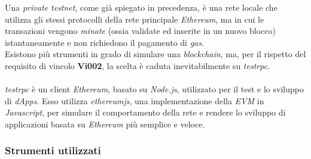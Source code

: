 \documentclass[11pt]{thesistemp}
\begin{document}
Una \textit{private testnet}, come già spiegato in precedenza, è una rete locale che utilizza gli stessi protocolli della rete principale \textit{Ethereum}, ma in cui le transazioni vengono \textit{minate} (ossia validate ed inserite in un nuovo blocco) istantaneamente e non richiedono il pagamento di \textit{gas}.\\
Esistono più strumenti in grado di simulare una \textit{blockchain}, ma, per il rispetto del requisito di vincolo \textbf{Vi002}, la scelta è caduta inevitabilmente su \textit{testrpc}.\\\\
\textit{testrpc} è un client \textit{Ethereum}, basato su \textit{Node.js}, utilizzato per il test e lo sviluppo di \textit{dApps}. Esso utilizza \textit{ethereumjs}, una implementazione della \textit{EVM} in \textit{Javascript}, per simulare il comportamento della rete e rendere lo sviluppo di applicazioni basata su \textit{Ethereum} più semplice e veloce.

\subsubsection{Strumenti utilizzati}
\end{document}

